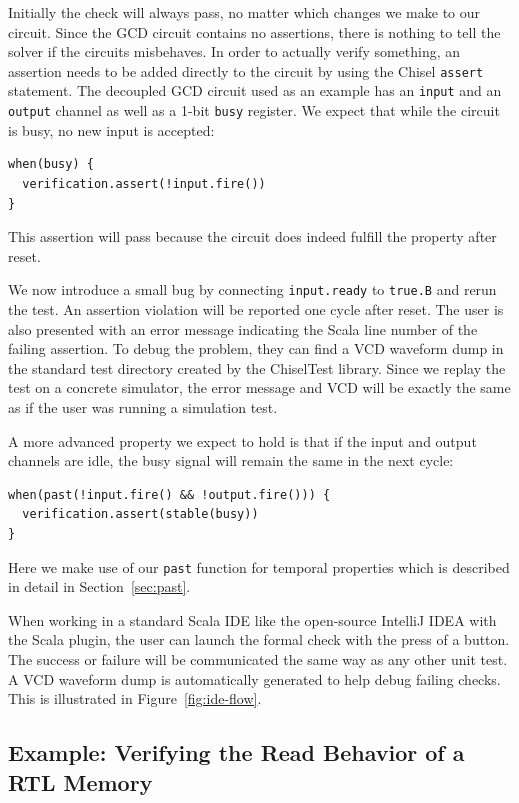 \documentclass[conference]{IEEEtran}
\newcommand{\code}[1]{{\small{\texttt{#1}}}}
\begin{document}
Initially the check will always pass, no matter which changes we make to our circuit.
Since the GCD circuit contains no assertions, there is nothing to tell the solver if the circuits misbehaves.
In order to actually verify something, an assertion needs to be added directly to the circuit by using the
Chisel \code{assert} statement.
The decoupled GCD circuit used as an example has an \code{input} and an \code{output} channel
as well as a 1-bit \code{busy} register.
We expect that while the circuit is busy, no new input is accepted:
\begin{verbatim}
when(busy) {
  verification.assert(!input.fire())
}
\end{verbatim}
This assertion will pass because the circuit does indeed fulfill the property after reset.


We now introduce a small bug by connecting \code{input.ready} to \code{true.B} and rerun the test.
An assertion violation will be reported one cycle after reset.
The user is also presented with an error message indicating the Scala line number of the failing assertion.
To debug the problem, they can find a VCD waveform dump in the standard test directory created by the
ChiselTest library.
Since we replay the test on a concrete simulator, the error message and VCD will be exactly the same
as if the user was running a simulation test.

A more advanced property we expect to hold is that if the input and output channels are idle, the busy
signal will remain the same in the next cycle:
\begin{verbatim}
when(past(!input.fire() && !output.fire())) {
  verification.assert(stable(busy))
}
\end{verbatim}
Here we make use of our \code{past} function for temporal properties which is described in detail in Section~\ref{sec:past}.


When working in a standard Scala IDE like the open-source IntelliJ IDEA with the Scala plugin, the user can launch the formal check with the press of a button.
The success or failure will be communicated the same way as any other unit test. A VCD waveform dump is automatically generated to help debug failing checks.
This is illustrated in Figure~\ref{fig:ide-flow}.

\subsection{Example: Verifying the Read Behavior of a RTL Memory}
\end{document}
